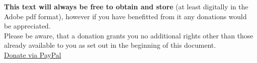 
\begin{center}
\vspace{20 mm}

\textbf{This text will always be free to obtain and store} (at least digitally in the Adobe pdf format), however if you have benefitted from it any donations would be appreciated.
\\
Please be aware, that a donation grants you no additional rights other than those already available to you as set out in the beginning of this document.
\\
\vspace{10 mm}
\href{https://www.paypal.com/cgi-bin/webscr?cmd=_donations&business=detlevcmphotography\%40live\%2ede&lc=GB&item_name=Detlev\%20Conrad\%20Mielczarek\%20\%2d\%20A\%20basic\%20introduction\%20to\%20Photography\%2c\%20eBook&item_number=Photography\%2dGuide&currency_code=GBP&bn=PP\%2dDonationsBF\%3abtn_donateCC_LG\%2egif\%3aNonHosted}{Donate via PayPal}
\end{center}
